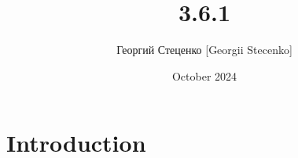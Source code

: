 \documentclass{article}
\title{3.6.1}
\author{Георгий Стеценко [Georgii Stecenko]}
\date{October 2024}
\begin{document}
\maketitle

\section{Introduction}
\end{document}
